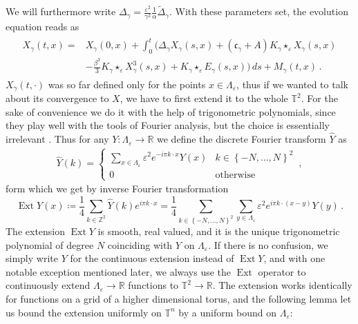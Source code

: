 \documentclass{report}
\newcommand{\ZZ}{\mathbb{Z}}
\newcommand{\RR}{\mathbb{R}}
\newcommand{\TT}{\mathbb{T}}
\newcommand{\Convolve}[3][]{#2 \star_{#1} #3}
\DeclareMathOperator{\DefiningEquality}{\coloneqq}
\DeclareMathOperator{\Ext}{Ext}
\theoremstyle{remark}
\theoremstyle{definition}
\let\epsilon\varepsilon
\begin{document}
We will furthermore write $\Delta_\gamma = \frac{\epsilon^2}{\gamma^2}\frac{1}{\alpha}\tilde{\Delta}_\gamma$. With these parameters set, the evolution equation reads as
\begin{align}
  \label{eq:evolution_in_macroscopic_coordintes_fixed}
  \begin{split}
      X_\gamma(t, x) =& X_\gamma(0, x) + \int_{0}^{t} \biggl({\Delta}_\gamma X_\gamma(s, x) + (\mathfrak{c}_\gamma + A) \Convolve[\epsilon]{K_\gamma}{X_\gamma(s, x)}\\
    &-\frac{\beta^3}{3} \Convolve[\epsilon]{K_\gamma}{X_\gamma^3(s, x)} + \Convolve[\epsilon]{K_\gamma}{E_\gamma(s, x)}\biggr)\,ds + M_\gamma(t, x)\,.
  \end{split}
\end{align}
$X_\gamma(t, \cdot)$ was so far defined only for the points $x \in \Lambda_\epsilon$, thus if we wanted to talk about its convergence to $X$, we have to first extend it to the whole $\TT^2$. For the sake of convenience we do it with the help of trigonometric polynomials, since they play well with the tools of Fourier analysis, but the choice is essentially irrelevant \cite{mourrat2015convergencetwodimensionaldynamicisingkac}. Thus for any $Y: \Lambda_\epsilon \to \RR$ we define the discrete Fourier transform $\hat{Y}$ as \begin{align}
  \hat{Y}(k) = \begin{cases}
      \sum_{x \in \Lambda_\epsilon} \epsilon^2 e^{- i \pi k \cdot x} Y(x)&k \in \left\{-N, \ldots, N\right\}^2\\
      0&\text{otherwise}
  \end{cases}\,,
\end{align}
form which we get by inverse Fourier transformation $$\Ext Y(x) \DefiningEquality \frac{1}{4} \sum_{k \in \ZZ^2} \hat{Y}(k) e^{i \pi k \cdot x} = \frac{1}{4} \sum_{k \in \left\{-N, \dots, N\right\}^2} \sum_{y \in \Lambda_\epsilon}\epsilon^2 e^{i \pi k \cdot (x -y)} Y(y)\,.$$
The extension $\Ext Y$ is smooth, real valued, and it is the unique trigonometric polynomial of degree $N$ coinciding with $Y$ on $\Lambda_\epsilon$. If there is no confusion, we simply write $Y$ for the continuous extension instead of $\Ext{Y}$, and with one notable exception mentioned later, we always use the $\Ext$ operator to continuously extend $\Lambda_\epsilon \to \RR$ functions to $\TT^2 \to \RR$. The extension works identically for functions on a grid of a higher dimensional torus, and the following lemma let us bound the extension uniformly on $\TT^n$ by a uniform bound on $\Lambda_\epsilon$:
\end{document}
